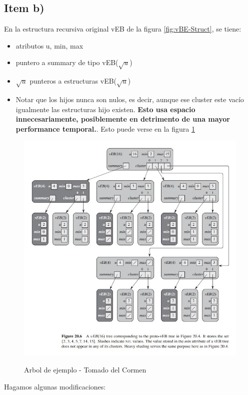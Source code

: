 \documentclass[10pt,a4paper]{article}
\begin{document}
\subsection{Item b)}
En la estructura recursiva original vEB de la figura \ref{fig:vBE-Struct}, se tiene:
\begin{itemize}
    \item atributos u, min, max
    \item puntero a summary de tipo vEB($\sqrt{u}$)
    \item $\sqrt{u}$ punteros a estructuras vEB($\sqrt{u}$)
    \item Notar que los hijos nunca son nulos, es decir, aunque ese cluster este vacío igualmente las estructuras hijo existen. \textbf{Esto usa espacio innecesariamente, posiblemente en detrimento de una mayor performance temporal.}. Esto puede verse en la figura \ref{fig:vBE-Ejemplo_Arbol}
\end{itemize}

\begin{figure}[H]
    \centering
    \includegraphics[scale=0.75]{fig/Full-vBE.JPG}
    \label{fig:vBE-Ejemplo_Arbol}
    \caption{Arbol de ejemplo - Tomado del Cormen}
\end{figure}

Hagamos algunas modificaciones:
\end{document}
